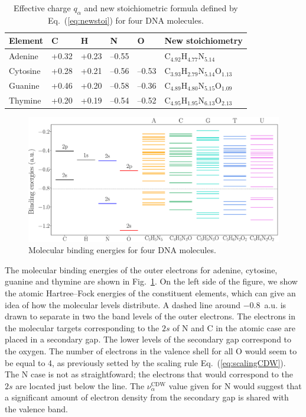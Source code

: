 \documentclass[preprint,12pt]{article}
\begin{document}
\begin{table}[H]
\begin{center}
\begin{tabular}{|p{}|p{}|p{}|p{
}|p{}|p{}|}
\hline
Element & C & H & N & O & New stoichiometry \\
\hline
Adenine & +0.32 & +0.23 & --0.55 &       & 
C$_{4.92}$H$_{4.77}$N$_{5.14}$ \\ 
\hline
Cytosine & +0.28 & +0.21 & --0.56 & --0.53 & 
C$_{3.93}$H$_{2.79}$N$_{5.14}$O$_{1.13}$ \\ 
\hline
Guanine & +0.46 & +0.20 & --0.58 & --0.36 & 
C$_{4.89}$H$_{4.80}$N$_{5.15}$O$_{1.09}$ \\ 
\hline
Thymine & +0.20 & +0.19 & --0.54 & --0.52 & 
C$_{4.95}$H$_{1.95}$N$_{6.13}$O$_{2.13}$ \\ 
\hline
\end{tabular}
\caption{Effective charge $q_{\alpha}$ and new stoichiometric formula 
defined by Eq.~(\ref{eq:newstoi}) for four DNA molecules.}
\label{tab:newstoi}
\end{center}
\end{table}

\begin{figure}[t!]
\centering
\includegraphics[width=\textwidth]{figuras/levelsDNA.eps}
\caption{Molecular binding energies for four DNA molecules.}
\label{fig:bindener}
\end{figure}

The molecular binding energies of the outer electrons for adenine, 
cytosine, guanine and thymine are shown in Fig.~\ref{fig:bindener}. 
On the left side of the figure, we show the atomic Hartree--Fock energies 
of the constituent elements, which can give an idea of how the molecular 
levels distribute. A dashed line around $-0.8$~a.u. is drawn to separate 
in two the band levels of the outer electrons. The electrons in the molecular 
targets corresponding to the $2s$ of N and C in the atomic case are 
placed in a secondary gap. The lower levels of the secondary gap 
correspond to the oxygen. The number of electrons in the valence 
shell for all O would seem to be equal to 4, as previously setted by the 
scaling rule Eq.~(\ref{eq:scalingCDW}). The N case is not as 
straightfoward; the electrons that would correspond to the $2s$ are 
located just below the line. The $\nu_{\alpha }^{\text{CDW}}$ value 
given for N would suggest that a significant amount of electron density 
from the secondary gap is shared with the valence band.
\end{document}

